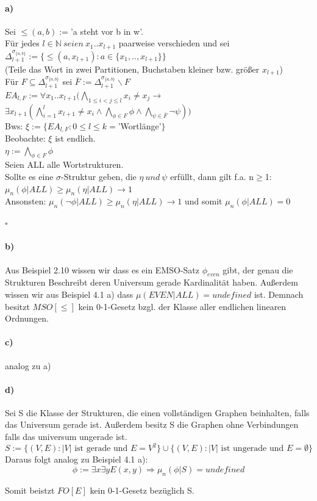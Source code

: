 \documentclass[12pt]{article}
\begin{document}
\paragraph{a)}
Sei $\leq(a,b):=$'a steht vor b in w'.\\
Für jedes $l\in \mathbb{N}\ seien\ x_1 .. x_{l+1}$ paarweise verschieden und sei\\
$\Delta^{\sigma_{\{a,b\}}}_{l+1} := \{ \leq(a,x_{l+1}) : a \in \{x_1, .., x_{l+1}\} \}$\\
(Teile das Wort in zwei Partitionen, Buchstaben kleiner bzw. größer $x_{l+1}$)\\
Für $F \subseteq \Delta^{\sigma_{\{a,b\}}}_{l+1}$ sei $\bar F:=\Delta^{\sigma_{\{a,b\}}}_{l+1} \backslash F$\\
$EA_{l,F}:=\forall x_1 .. x_{l+1} (\bigwedge\limits_{1 \leq i < j \leq l} x_i \neq x_j \rightarrow$ 
$\exists x_{l+1}(\bigwedge\limits_{i=1}^l x_{l+1} \neq x_i \land \bigwedge\limits_{\phi \in F} \phi \land \bigwedge\limits_{\psi \in \bar F} \neg \psi))$\\
Bws: $\xi :=  \{ EA_{l,F} : 0 \leq l \leq k = $'Wortlänge'$\}$\\
Beobachte: $\xi$ ist endlich.\\
$\eta := \bigwedge\limits_{\phi \in F} \phi$\\
Seien ALL alle Wortstrukturen.\\
Sollte es eine $\sigma$-Struktur geben, die $\eta \ und\ \psi$ erfüllt, dann gilt f.a. n$\geq$1:\\
$\mu_n(\phi | ALL) \geq \mu_n (\eta | ALL) \rightarrow 1$\\
Ansonsten: $\mu_n(\neg \phi | ALL) \geq \mu_n (\eta | ALL) \rightarrow 1$ und somit $\mu_n(\phi | ALL) = 0$
\begin{flushright}
$\square$
\end{flushright}
\paragraph{b)}
Aus Beispiel 2.10 wissen wir dass es ein EMSO-Satz $\phi_{even}$ gibt, der genau die Strukturen Beschreibt deren Universum gerade Kardinalität haben. Außerdem wissen wir aus Beispiel 4.1 a) dass $\mu( EVEN | ALL ) = undefined$ ist. Demnach besitzt $MSO[\leq]$ kein 0-1-Gesetz bzgl. der Klasse aller endlichen linearen Ordnungen.
\paragraph{c)}
analog zu a)
\paragraph{d)}
Sei S die Klasse der Strukturen, die einen vollständigen Graphen beinhalten, falls das Universum gerade ist. Außerdem besitz S die Graphen ohne Verbindungen falls das universum ungerade ist. 
\[ S:=\{(V,E):|V|\text{ ist gerade und } E=V^2\} \cup \{(V,E):|V|\text{ ist ungerade und } E=\emptyset\} \] 
Daraus folgt analog zu Beispiel 4.1 a):
$$\phi:=\exists x\exists y E(x,y)\Rightarrow  \mu_n(\phi|S) = undefined $$

Somit beistzt $FO[E]$ kein 0-1-Gesetz bezüglich S. 
\end{document}

